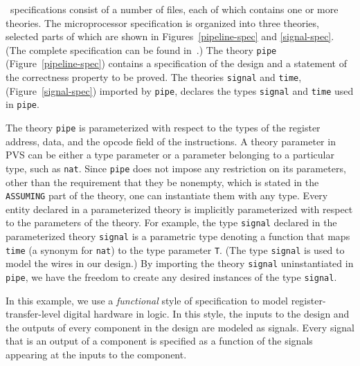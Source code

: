 \pvs\ specifications consist of a number of files, each of which
contains one or more theories.
The microprocessor specification is organized into three theories, selected
parts of which are shown in Figures~\ref{pipeline-spec} and
\ref{signal-spec}.
(The complete specification can be found in~\cite{HW-Tutorial:Report}.)
The theory {\tt pipe} (Figure~\ref{pipeline-spec})
contains a specification
of the design and a statement of the correctness property to be
proved.
The theories {\tt signal} and {\tt time}, (Figure~\ref{signal-spec})
imported by {\tt pipe}, declares the types {\tt signal} and {\tt time}
used in {\tt pipe}.


The theory {\tt pipe} is parameterized with respect to the types of the
register address, data, and the opcode field of the instructions.
A theory parameter in PVS can be either a type parameter or
a parameter belonging to a particular type, such as {\tt nat}.
Since {\tt pipe} does not impose any restriction on its parameters,
other than the requirement that they be nonempty, which is stated
in the {\tt ASSUMING} part of the theory,
one can instantiate them with any type.
Every entity declared in a parameterized theory is implicitly parameterized
with respect to the parameters of the theory.
For example, the type {\tt signal} declared in the parameterized
theory {\tt signal} is a parametric type denoting a function that
maps {\tt time} (a synonym for {\tt nat})
to the type parameter {\tt T}.  (The type {\tt signal} is used
to model the wires in our design.)
By importing the theory {\tt signal} uninstantiated in {\tt pipe},
we have the freedom to create any desired instances of the type
{\tt signal}.

In this example, we use a {\em functional} style of specification
to model register-transfer-level digital hardware in logic.
In this style, the inputs to the design and the outputs of every component
in the design are modeled as signals.
Every signal that is an output of a component is
specified as a function of the signals appearing at the inputs to
the component.


